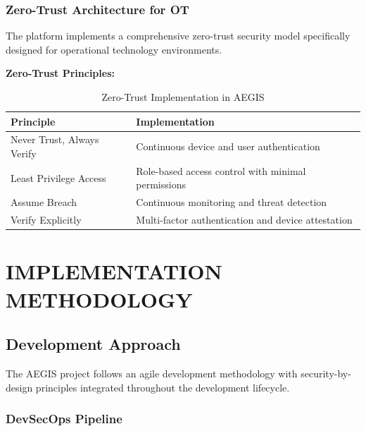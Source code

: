 \documentclass[12pt,a4paper]{article}
\begin{document}
\subsubsection{Zero-Trust Architecture for OT}

The platform implements a comprehensive zero-trust security model specifically designed for operational technology environments.

\textbf{Zero-Trust Principles:}
\begin{table}[H]
\centering
\begin{tabular}{|p{4cm}|p{8cm}|}
\hline
\rowcolor{lightblue}
\textbf{Principle} & \textbf{Implementation} \\
\hline
Never Trust, Always Verify & Continuous device and user authentication \\
\hline
Least Privilege Access & Role-based access control with minimal permissions \\
\hline
Assume Breach & Continuous monitoring and threat detection \\
\hline
Verify Explicitly & Multi-factor authentication and device attestation \\
\hline
\end{tabular}
\caption{Zero-Trust Implementation in AEGIS}
\end{table}

\newpage

\section{IMPLEMENTATION METHODOLOGY}

\subsection{Development Approach}

The AEGIS project follows an agile development methodology with security-by-design principles integrated throughout the development lifecycle.

\subsubsection{DevSecOps Pipeline}
\end{document}
